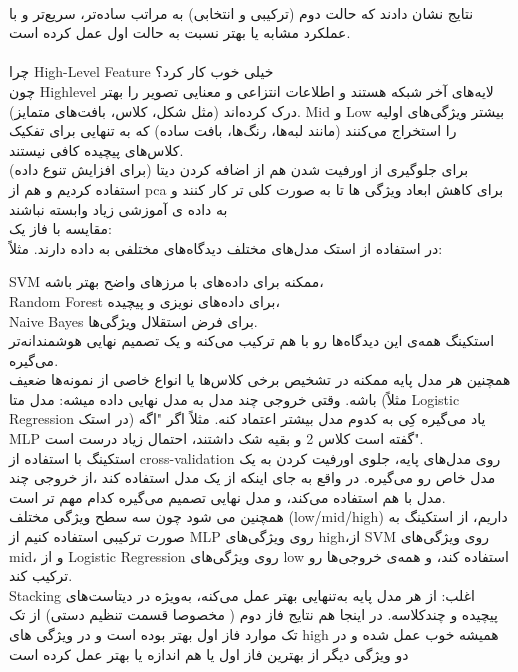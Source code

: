 \documentclass[a4paper,12pt]{article}
\begin{document}
\FloatBarrier
\\
نتایج نشان دادند که حالت دوم (ترکیبی و انتخابی) به مراتب ساده‌تر، سریع‌تر و با عملکرد مشابه یا بهتر نسبت به حالت اول عمل کرده است.\\
\\
 چرا  High-Level Feature خیلی خوب کار کرد؟\\
 چون Highlevel  لایه‌های آخر شبکه هستند و اطلاعات انتزاعی و معنایی تصویر را بهتر درک کرده‌اند (مثل شکل، کلاس، بافت‌های متمایز). Mid و Low  بیشتر ویژگی‌های اولیه را استخراج می‌کنند (مانند لبه‌ها، رنگ‌ها، بافت ساده) که به تنهایی برای تفکیک کلاس‌های پیچیده کافی نیستند.
\\
برای جلوگیری از اورفیت شدن هم از اضافه کردن دیتا (برای افزایش تنوع داده) استفاده کردیم  و هم از pca برای کاهش ابعاد ویژگی ها تا به صورت کلی تر کار کنند و به داده ی آموزشی زیاد وابسته نباشند
\\
مقایسه با فاز یک:
\\
در استفاده از استک مدل‌های مختلف دیدگاه‌های مختلفی به داده دارند. مثلاً:

SVM ممکنه برای داده‌های با مرزهای واضح بهتر باشه،
\\
Random Forest برای داده‌های نویزی و پیچیده،
\\
Naive Bayes برای فرض استقلال ویژگی‌ها.
\\
استکینگ همه‌ی این دیدگاه‌ها رو با هم ترکیب می‌کنه و یک تصمیم نهایی هوشمندانه‌تر می‌گیره.
\\
همچنین هر مدل پایه ممکنه در تشخیص برخی کلاس‌ها یا انواع خاصی از نمونه‌ها ضعیف باشه. وقتی خروجی چند مدل به مدل نهایی داده میشه: مدل متا (مثلاً Logistic Regression در استک) یاد می‌گیره کِی به کدوم مدل بیشتر اعتماد کنه. مثلاً اگر "اگه MLP گفته است کلاس 2 و بقیه شک داشتند، احتمال زیاد درست است".
\\
استکینگ با استفاده از cross-validation روی مدل‌های پایه، جلوی اورفیت کردن به یک مدل خاص رو می‌گیره. در واقع به جای اینکه از یک مدل استفاده کند ،از خروجی چند مدل با هم استفاده می‌کند، و مدل نهایی تصمیم می‌گیره کدام مهم تر است.
\\
همچنین می شود چون سه سطح ویژگی مختلف (low/mid/high) داریم،  از استکینگ به صورت ترکیبی استفاده کنیم از MLP روی ویژگی‌های high،از SVM روی ویژگی‌های mid، و از Logistic Regression روی ویژگی‌های low
استفاده کند، و همه‌ی خروجی‌ها رو ترکیب کند.
\\
 Stacking اغلب:
از هر مدل پایه به‌تنهایی بهتر عمل می‌کنه،
به‌ویژه در دیتاست‌های پیچیده و چندکلاسه. در اینجا هم نتایج فاز دوم ( مخصوصا قسمت تنظیم دستی) از تک تک موارد فاز اول بهتر بوده است و در ویژگی های high همیشه خوب عمل شده  و در دو ویژگی دیگر از بهترین فاز اول یا هم اندازه یا بهتر عمل کرده است
\end{document}
